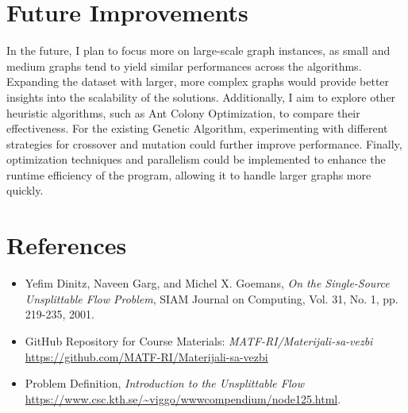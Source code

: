 \documentclass[a4paper,12pt]{article}
\begin{document}
\section{Future Improvements}

In the future, I plan to focus more on large-scale graph instances, as small and medium graphs tend to yield similar performances across the algorithms. Expanding the dataset with larger, more complex graphs would provide better insights into the scalability of the solutions. Additionally, I aim to explore other heuristic algorithms, such as Ant Colony Optimization, to compare their effectiveness. For the existing Genetic Algorithm, experimenting with different strategies for crossover and mutation could further improve performance. Finally, optimization techniques and parallelism could be implemented to enhance the runtime efficiency of the program, allowing it to handle larger graphs more quickly.


\clearpage

\section*{References}

\begin{itemize}
    \item Yefim Dinitz, Naveen Garg, and Michel X. Goemans, \textit{On the Single-Source Unsplittable Flow Problem}, SIAM Journal on Computing, Vol. 31, No. 1, pp. 219-235, 2001.
    \item GitHub Repository for Course Materials: \textit{MATF-RI/Materijali-sa-vezbi} \newline
    \url{https://github.com/MATF-RI/Materijali-sa-vezbi}
    \item Problem Definition, \textit{Introduction to the Unsplittable Flow} \newline
    \url{https://www.csc.kth.se/~viggo/wwwcompendium/node125.html}.
\end{itemize}



\end{document}
